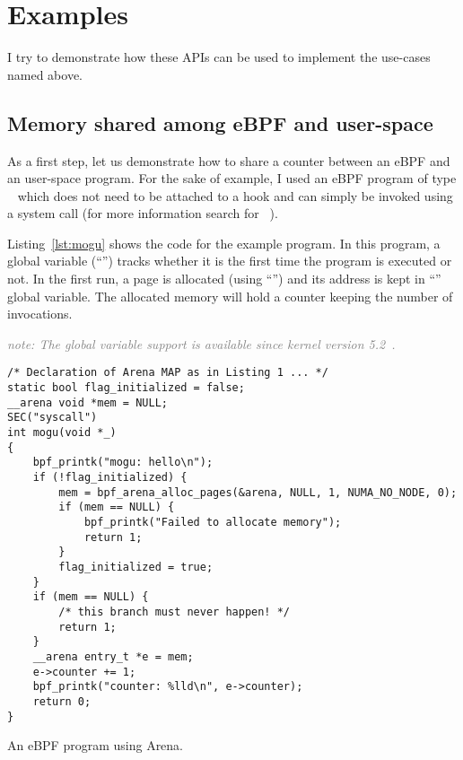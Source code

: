 \documentclass{article} \usepackage{graphicx}
\begin{document}


\section{Examples}

I try to demonstrate how these APIs can be used to implement the use-cases
named above.

\subsection{Memory shared among eBPF and user-space}

As a first step, let us demonstrate how to share a counter between an eBPF
and an user-space program. For the sake of example, I used an eBPF program of type
~\cite{ebpf_docs_prog_syscall} which does not need to
be attached to a hook and can simply be invoked using a system call (for more
information search for ~\cite{ebpf_docs_bpf_prog_run}).

Listing~\ref{lst:mogu} shows the code for the example program. In this
program, a global variable (``'') tracks whether it is the first
time the program is executed or not. In the first run, a page is allocated
(using ``'') and its address is kept in
``'' global variable. The allocated memory will hold a counter keeping
the number of invocations.

\textcolor{gray}{\textit{note: The global variable support is available since
kernel version 5.2~\cite{glb_var_post}.}}

\begin{listing}
\begin{verbatim}
/* Declaration of Arena MAP as in Listing 1 ... */
static bool flag_initialized = false;
__arena void *mem = NULL;
SEC("syscall")
int mogu(void *_)
{
    bpf_printk("mogu: hello\n");
    if (!flag_initialized) {
        mem = bpf_arena_alloc_pages(&arena, NULL, 1, NUMA_NO_NODE, 0);
        if (mem == NULL) {
            bpf_printk("Failed to allocate memory");
            return 1;
        }
        flag_initialized = true;
    }
    if (mem == NULL) {
        /* this branch must never happen! */
        return 1;
    }
    __arena entry_t *e = mem;
    e->counter += 1;
    bpf_printk("counter: %lld\n", e->counter);
    return 0;
}
\end{verbatim}
\caption{An eBPF program using Arena.}
\label{lst:mogu}
\end{listing}
\end{document}

